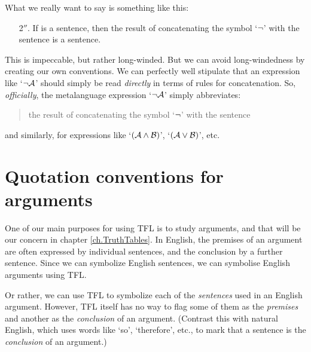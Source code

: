 What we really want to say is something like this:
	\begin{enumerate}
		\item[2$''$.] If  is a sentence, then the result of concatenating the symbol `$\neg$' with the sentence  is a sentence.
	\end{enumerate}
This is impeccable, but rather long-winded. %
But we can avoid long-windedness by creating our own conventions. We can perfectly well stipulate that an expression like `$\neg \mathcal{A}$' should simply be read \emph{directly} in terms of rules for concatenation. So, \emph{officially}, the metalanguage expression `$\neg \mathcal{A}$'
simply abbreviates:
\begin{quote}
	the result of concatenating the symbol `$\neg$' with the sentence 
\end{quote}
and similarly, for expressions like `$(\mathcal{A} \wedge \mathcal{B})$', `$(\mathcal{A} \vee \mathcal{B})$', etc.


\section{Quotation conventions for arguments}
One of our main purposes for using TFL is to study arguments, and that will be our concern in chapter \ref{ch.TruthTables}. In English, the premises of an argument are often expressed by individual sentences, and the conclusion by a further sentence. Since we can symbolize English sentences, we can symbolise English arguments using TFL.

Or rather, we can use TFL to symbolize each of the \emph{sentences} used in an English argument. However, TFL itself has no way to flag some of them as the \emph{premises} and another as the \emph{conclusion} of an argument.  (Contrast this with natural English, which uses words like `so', `therefore', etc., to mark that a sentence is the \emph{conclusion} of an argument.)

